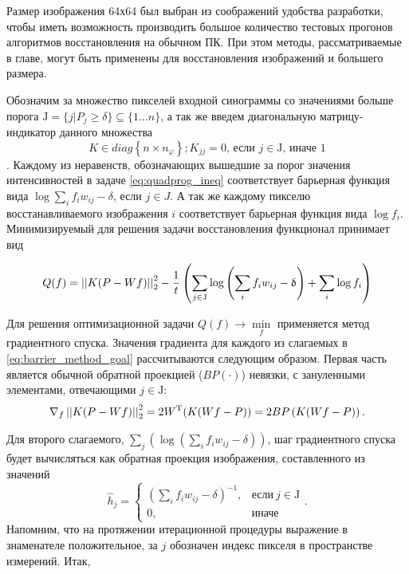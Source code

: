 Размер изображения 64х64 был выбран из соображений удобства разработки, чтобы иметь возможность производить большое количество тестовых прогонов алгоритмов восстановления на обычном ПК.
При этом методы, рассматриваемые в главе, могут быть применены для восстановления изображений и большего размера.


Обозначим за множество пикселей входной синограммы со значениями больше порога $\mathrm J = \{j | P_j \geq \delta \} \subseteq \{1 \dots n\}$, а так же введем диагональную матрицу-индикатор данного множества 
$$
K \in diag\left\{n \times n_\varphi\right\}; K_{jj} = 0 \text{, если\ } j \in \mathrm J \text{, иначе\ } 1
$$.
Каждому из неравенств, обозначающих вышедшие за порог значения интенсивностей в задаче \ref{eq:quadprog_ineq} соответствует барьерная функция вида $\log{\sum_i f_{i} w_{ij} - \delta}$, если $j \in J$. 
А так же каждому пикселю восстанавливаемого изображения $i$ соответствует барьерная функция вида $\log{f_i}$.
Минимизируемый для решения задачи восстановления функционал принимает вид

\begin{equation}
\label{eq:barrier_method_goal}
  Q(f) = \left|\left| K(P - Wf) \right|\right|_2^2 - 
  \frac 1 t \left( 
    \sum_{j \in \mathrm J}{
      \log{\left(\sum_i {f_i w_{ij} - \updelta} \right)}
    }
    +
    \sum_{i}{
      \log{f_i}
    }
  \right)
\end{equation}

Для решения оптимизационной задачи $Q(f) \rightarrow \min\limits_f$ применяется метод градиентного спуска.
Значения градиента для каждого из слагаемых в \ref{eq:barrier_method_goal} рассчитываются следующим образом. 
Первая часть является обычной обратной проекцией ($BP(\cdot)$) невязки, с зануленными элементами, отвечающими $j \in \mathrm J$:
$$
\nabla_f \left|\left| K(P - Wf) \right|\right|_2^2 = 2 W ^ {\mathrm T} (K(Wf - P)) = 
  2 BP\left(K(Wf-P)\right).
$$

Для второго слагаемого, $\sum_j {\left(\log{\left(\sum_i {f_i w_{ij} - \delta} \right)}\right)}$, шаг градиентного спуска будет вычисляться как обратная проекция изображения, составленного из значений 
$$
\hat{h}_j = 
  \begin{cases}
    \left(\sum_i {f_i w_{ij}} - \delta \right)^{-1}, & \text{если}\ j \in \mathrm J \\
    0, & \text{иначе}
  \end{cases}.
$$
Напомним, что на протяжении итерационной процедуры выражение в знаменателе положительное, за $j$ обозначен индекс пикселя в пространстве измерений.
Итак,

